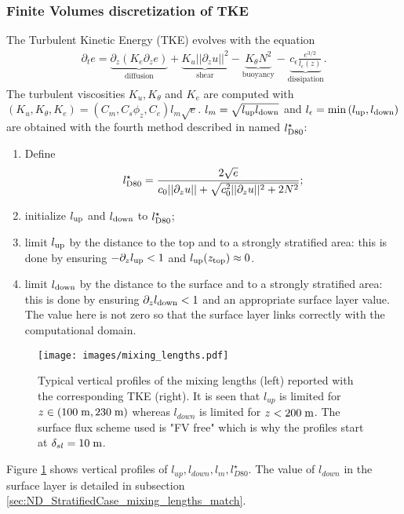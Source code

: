 \subsubsection{Finite Volumes discretization of TKE}
The Turbulent Kinetic Energy (TKE) evolves with the equation
\begin{equation}
\label{eq:ND_StratifiedCase_TKE}
    \begin{aligned}
    \partial_t e =
    \underbrace{\partial_z \left(K_e
    \partial_z e\right)}_{\text{diffusion}}
    + \underbrace{K_u ||\partial_z u||^2}_{\text{shear}} 
    - \underbrace{K_{\theta} N^2 }_{\text{buoyancy}}
    - \underbrace{c_{\epsilon}
    \frac{e^{3/2}}{l_{\epsilon}(z)}}_{\text{dissipation}}.
    \end{aligned}
\end{equation}
The turbulent viscosities $K_u, K_{\theta}$ and $K_e$ are computed
with $(K_u, K_\theta, K_e) = (C_m , C_s \phi_z, C_e)l_m \sqrt{e}$.
$l_m = \sqrt{l_{\rm up} l_{\rm down}}$ and
$l_\epsilon = \min{(l_{\rm up}, l_{\rm down})}$
are obtained with the fourth method described in
\cite{lemarie_simplified_2021} named $l^\star_{\rm D80}$:
\begin{enumerate}
	\item Define
		\begin{equation}
			\label{eq:ND_StratifiedCase_lD80}
			l^\star_{\rm D80} = \frac{2\sqrt{e}}
			{c_0 ||\partial_z u|| + \sqrt{
				c_0^2 ||\partial_z u||^2 + 2 N^2
			}};
		\end{equation}
	\item initialize $l_{\rm up}$ and $l_{\rm down}$ to
		$l^\star_{\rm D80}$;
	\item limit $l_{\rm up}$ by the distance to the top and to
		a strongly stratified area: this is done by
		ensuring $-\partial_z l_{\rm up} < 1$ and
		$l_{\rm up}(z_{\rm top}) \approx 0$.
	\item limit $l_{\rm down}$ by the distance to the surface
		and to a strongly stratified area: this is done by
		ensuring $\partial_z l_{\rm down} < 1$ and
		an appropriate surface layer value.
		The value here is not zero so that the surface layer
		links correctly with the computational domain.
\end{enumerate}
\begin{figure}
	\centering
	\texttt{[image: images/mixing\_lengths.pdf]}
	\caption{Typical vertical profiles of the mixing lengths
	(left) reported with the corresponding TKE (right).
	It is seen that $l_{up}$ is limited for
	$z\in (100 \; {\rm m}, 230\; {\rm m})$ whereas
	$l_{down}$ is limited for $z<200 \;{\rm m}$. The surface flux
	scheme used is "FV free" which is why the
	profiles start at $\delta_{sl} = 10\;{\rm m}$.}
	\label{fig:ND_StratifiedCase_mixing_lengths}
\end{figure}
Figure \ref{fig:ND_StratifiedCase_mixing_lengths} shows vertical
profiles of $l_{up}, l_{down}, l_m, l_{D80}^\star$. The value of
$l_{down}$ in the surface layer is detailed in
subsection \ref{sec:ND_StratifiedCase_mixing_lengths_match}.
%
